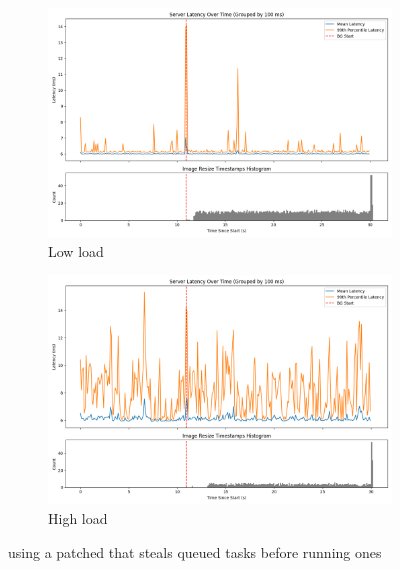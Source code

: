 \begin{figure}[t]
    \centering
    \begin{subfigure}[t]{0.49\columnwidth}
        \includegraphics[width=\columnwidth]{graphs/srv-bg-schedbe-low.png}
        \caption{Low load}\label{fig:srv-bg-schedbe-low}
    \end{subfigure}
    \hspace{\fill}
    \begin{subfigure}[t]{0.49\columnwidth}
        \includegraphics[width=\columnwidth]{graphs/srv-bg-schedbe-high.png}
        \caption{High load}\label{fig:srv-bg-schedbe-high}
    \end{subfigure}
    \vspace{4pt}
    \caption{using a patched \schedidle{} that steals queued \schednormal{}
    tasks before running \schedidle{} ones}\label{fig:srv-bg-schedbe}
\end{figure}

